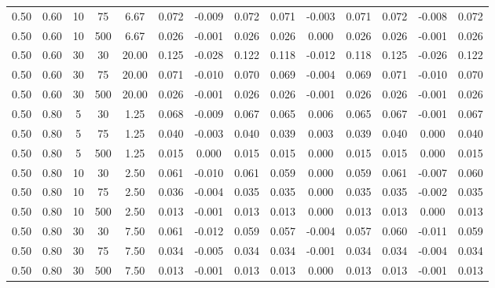 \documentclass[12pt,epsfig]{article}
\begin{document}
\begin{table}[h]
{\begin{tabular}{| c | c | c | c | c || c | c | c || c | c | c || c | c | c |}
 0.50 & 0.60 &  10 &  75 & 6.67 & 0.072 & -0.009 & 0.072 & 0.071 & -0.003 & 0.071 & 0.072 & -0.008 & 0.072 \\ 
 0.50 & 0.60 &  10 & 500 & 6.67 & 0.026 & -0.001 & 0.026 & 0.026 & 0.000 & 0.026 & 0.026 & -0.001 & 0.026 \\ 
 0.50 & 0.60 &  30 &  30 & 20.00 & 0.125 & -0.028 & 0.122 & 0.118 & -0.012 & 0.118 & 0.125 & -0.026 & 0.122 \\ 
  0.50 & 0.60 &  30 &  75 & 20.00 & 0.071 & -0.010 & 0.070 & 0.069 & -0.004 & 0.069 & 0.071 & -0.010 & 0.070 \\ 
0.50 & 0.60 &  30 & 500 & 20.00 & 0.026 & -0.001 & 0.026 & 0.026 & -0.001 & 0.026 & 0.026 & -0.001 & 0.026 \\ 
0.50 & 0.80 &   5 &  30 & 1.25 & 0.068 & -0.009 & 0.067 & 0.065 & 0.006 & 0.065 & 0.067 & -0.001 & 0.067 \\ 
 0.50 & 0.80 &   5 &  75 & 1.25 & 0.040 & -0.003 & 0.040 & 0.039 & 0.003 & 0.039 & 0.040 & 0.000 & 0.040 \\ 
0.50 & 0.80 &   5 & 500 & 1.25 & 0.015 & 0.000 & 0.015 & 0.015 & 0.000 & 0.015 & 0.015 & 0.000 & 0.015 \\ 
 0.50 & 0.80 &  10 &  30 & 2.50 & 0.061 & -0.010 & 0.061 & 0.059 & 0.000 & 0.059 & 0.061 & -0.007 & 0.060 \\ 
0.50 & 0.80 &  10 &  75 & 2.50 & 0.036 & -0.004 & 0.035 & 0.035 & 0.000 & 0.035 & 0.035 & -0.002 & 0.035 \\ 
  0.50 & 0.80 &  10 & 500 & 2.50 & 0.013 & -0.001 & 0.013 & 0.013 & 0.000 & 0.013 & 0.013 & 0.000 & 0.013 \\ 
 0.50 & 0.80 &  30 &  30 & 7.50 & 0.061 & -0.012 & 0.059 & 0.057 & -0.004 & 0.057 & 0.060 & -0.011 & 0.059 \\ 
0.50 & 0.80 &  30 &  75 & 7.50 & 0.034 & -0.005 & 0.034 & 0.034 & -0.001 & 0.034 & 0.034 & -0.004 & 0.034 \\ 
0.50 & 0.80 &  30 & 500 & 7.50 & 0.013 & -0.001 & 0.013 & 0.013 & 0.000 & 0.013 & 0.013 & -0.001 & 0.013 \\ 
   \hline
\end{tabular}
}

\end{table}
\end{document}
